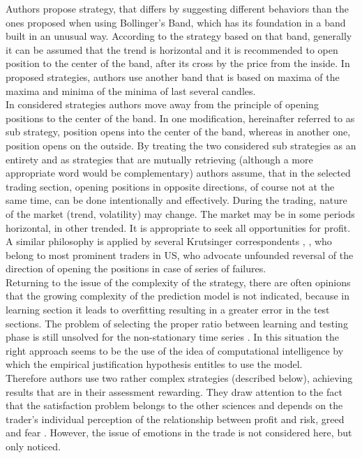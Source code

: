 \documentclass{tewiart}
\begin{document}
Authors propose strategy, that differs by suggesting different behaviors than the ones proposed when using Bollinger's Band, which has its foundation in a band built in an unusual way. According to the strategy based on that band, generally it can be assumed that the trend is horizontal and it is recommended to open position to the center of the band, after its cross by the price from the inside. In proposed strategies, authors use another band that is based on maxima of the maxima and minima of the minima of last several candles.\\

In considered strategies authors move away from the principle of opening positions to the center of the band. In one modification, hereinafter referred to as sub strategy, position opens into the center of the band, whereas in another one, position opens on the outside. By treating the two considered sub strategies as an entirety and as strategies that are mutually retrieving (although a more appropriate word would be complementary) authors assume, that in the selected trading section, opening positions in opposite directions, of course not at the same time, can be done intentionally and effectively. During the trading, nature of the market (trend, volatility) may change. The market may be in some periods horizontal, in other trended. It is appropriate to seek all opportunities for profit. A similar philosophy is applied by several Krutsinger correspondents \cite{Krutsinger}, , who belong to most prominent traders in US, who advocate unfounded reversal of the direction of opening the positions in case of series of failures.\\

Returning to the issue of the complexity of the strategy, there are often opinions that the growing complexity of the prediction model is not indicated, because in learning section it  leads to overfitting \cite{Murphy, Cai, Fujimoto}  resulting in a greater error in the test sections. The problem of selecting the proper ratio between learning and testing phase is still unsolved for the non-stationary time series \cite{Ball, Ivakhnenko}. In this situation the right approach seems to be the use of the idea of computational intelligence \cite{Polya, Pedrycz} by which the empirical justification hypothesis entitles to use the model.\\

Therefore authors use two rather complex strategies (described below), achieving results that are in their assessment rewarding. They draw attention to the fact that the satisfaction problem belongs to the other sciences and depends on the trader's individual perception of the relationship between profit and risk, greed and fear \cite{Kahneman}. However, the issue of emotions in the trade is not considered here, but only noticed.\\
\end{document}
